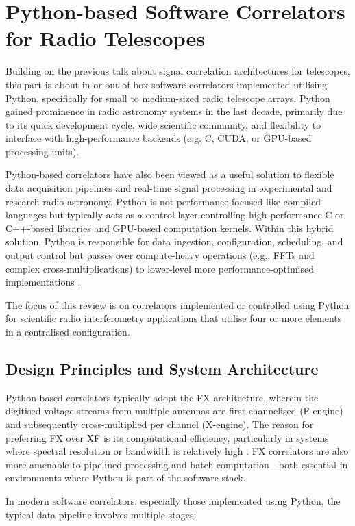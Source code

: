 \section{Python-based Software Correlators for Radio Telescopes}
Building on the previous talk about signal correlation architectures for telescopes, this part is about in-or-out-of-box software correlators implemented utilising Python, specifically for small to medium-sized radio telescope arrays. Python gained prominence in radio astronomy systems in the last decade, primarily due to its quick development cycle, wide scientific community, and flexibility to interface with high-performance backends (e.g. C, CUDA, or GPU-based processing units).

Python-based correlators have also been viewed as a useful solution to flexible data acquisition pipelines and real-time signal processing in experimental and research radio astronomy. Python is not performance-focused like compiled languages but typically acts as a control-layer controlling high-performance C or C++-based libraries and GPU-based computation kernels. Within this hybrid solution, Python is responsible for data ingestion, configuration, scheduling, and output control but passes over compute-heavy operations (e.g., FFTs and complex cross-multiplications) to lower-level more performance-optimised implementations \cite{Merry2023}.

The focus of this review is on correlators implemented or controlled using Python for scientific radio interferometry applications that utilise four or more elements in a centralised configuration.

    \subsection{Design Principles and System Architecture}
    Python-based correlators typically adopt the FX architecture, wherein the digitised voltage streams from multiple antennas are first channelised (F-engine) and subsequently cross-multiplied per channel (X-engine). The reason for preferring FX over XF is its computational efficiency, particularly in systems where spectral resolution or bandwidth is relatively high \cite{Romein2021}. FX correlators are also more amenable to pipelined processing and batch computation—both essential in environments where Python is part of the software stack.

    In modern software correlators, especially those implemented using Python, the typical data pipeline involves multiple stages:

